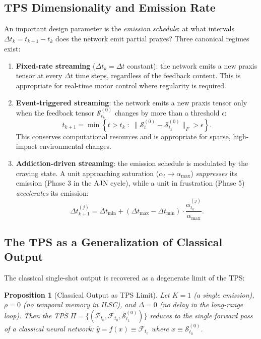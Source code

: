 \documentclass[12pt,a4paper]{article}
\newtheorem{proposition}{Proposition}
\newcommand{\tens}[1]{\boldsymbol{\mathcal{#1}}}
\begin{document}
\subsection{TPS Dimensionality and Emission Rate}

An important design parameter is the \textit{emission schedule}: at what intervals
$\Delta t_k = t_{k+1} - t_k$ does the network emit partial praxes? Three
canonical regimes exist:

\begin{enumerate}
\item \textbf{Fixed-rate streaming} ($\Delta t_k = \Delta t$ constant): the
network emits a new praxis tensor at every $\Delta t$ time steps, regardless of
the feedback content. This is appropriate for real-time motor control where
regularity is required.

\item \textbf{Event-triggered streaming}: the network emits a new praxis tensor
only when the feedback tensor $\tens{S}_{t_k}^{(0)}$ changes by more than a
threshold $\epsilon$:
\begin{equation}
t_{k+1} = \min\!\left\{t > t_k \;:\;
\|\tens{S}_t^{(0)} - \tens{S}_{t_k}^{(0)}\|_F > \epsilon\right\}.
\label{eq:event_trigger}
\end{equation}
This conserves computational resources and is appropriate for sparse, high-impact
environmental changes.

\item \textbf{Addiction-driven streaming}: the emission schedule is modulated by
the craving state. A unit approaching saturation ($\alpha_t \to \alpha_{\max}$)
\textit{suppresses} its emission (Phase 3 in the AJN cycle), while a unit in
frustration (Phase 5) \textit{accelerates} its emission:
\begin{equation}
\Delta t_{k+1}^{(j)} = \Delta t_{\min} + (\Delta t_{\max} - \Delta t_{\min})
\cdot \frac{\alpha_{t_k}^{(j)}}{\alpha_{\max}}.
\label{eq:addict_rate}
\end{equation}
\end{enumerate}

\subsection{The TPS as a Generalization of Classical Output}

The classical single-shot output is recovered as a degenerate limit of the TPS:

\begin{proposition}[Classical Output as TPS Limit]
\label{prop:degenerate}
Let $K = 1$ (a single emission), $\rho = 0$ (no temporal memory in ILSC),
and $\Delta = 0$ (no delay in the long-range loop). Then the TPS
$\Pi = \{(\tens{P}_{t_0}, \tens{F}_{t_0}, \tens{S}_{t_1}^{(0)})\}$ reduces to
the single forward pass of a classical neural network:
$\hat{y} = f(x) \equiv \tens{F}_{t_0}$ where $x \equiv \tens{S}_{t_0}^{(0)}$.
\end{proposition}
\end{document}
